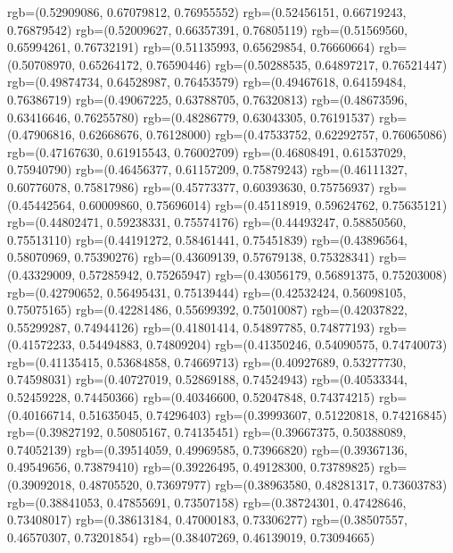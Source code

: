 {{        rgb=(0.52909086, 0.67079812, 0.76955552)
        rgb=(0.52456151, 0.66719243, 0.76879542)
        rgb=(0.52009627, 0.66357391, 0.76805119)
        rgb=(0.51569560, 0.65994261, 0.76732191)
        rgb=(0.51135993, 0.65629854, 0.76660664)
        rgb=(0.50708970, 0.65264172, 0.76590446)
        rgb=(0.50288535, 0.64897217, 0.76521447)
        rgb=(0.49874734, 0.64528987, 0.76453579)
        rgb=(0.49467618, 0.64159484, 0.76386719)
        rgb=(0.49067225, 0.63788705, 0.76320813)
        rgb=(0.48673596, 0.63416646, 0.76255780)
        rgb=(0.48286779, 0.63043305, 0.76191537)
        rgb=(0.47906816, 0.62668676, 0.76128000)
        rgb=(0.47533752, 0.62292757, 0.76065086)
        rgb=(0.47167630, 0.61915543, 0.76002709)
        rgb=(0.46808491, 0.61537029, 0.75940790)
        rgb=(0.46456377, 0.61157209, 0.75879243)
        rgb=(0.46111327, 0.60776078, 0.75817986)
        rgb=(0.45773377, 0.60393630, 0.75756937)
        rgb=(0.45442564, 0.60009860, 0.75696014)
        rgb=(0.45118919, 0.59624762, 0.75635121)
        rgb=(0.44802471, 0.59238331, 0.75574176)
        rgb=(0.44493247, 0.58850560, 0.75513110)
        rgb=(0.44191272, 0.58461441, 0.75451839)
        rgb=(0.43896564, 0.58070969, 0.75390276)
        rgb=(0.43609139, 0.57679138, 0.75328341)
        rgb=(0.43329009, 0.57285942, 0.75265947)
        rgb=(0.43056179, 0.56891375, 0.75203008)
        rgb=(0.42790652, 0.56495431, 0.75139444)
        rgb=(0.42532424, 0.56098105, 0.75075165)
        rgb=(0.42281486, 0.55699392, 0.75010087)
        rgb=(0.42037822, 0.55299287, 0.74944126)
        rgb=(0.41801414, 0.54897785, 0.74877193)
        rgb=(0.41572233, 0.54494883, 0.74809204)
        rgb=(0.41350246, 0.54090575, 0.74740073)
        rgb=(0.41135415, 0.53684858, 0.74669713)
        rgb=(0.40927689, 0.53277730, 0.74598031)
        rgb=(0.40727019, 0.52869188, 0.74524943)
        rgb=(0.40533344, 0.52459228, 0.74450366)
        rgb=(0.40346600, 0.52047848, 0.74374215)
        rgb=(0.40166714, 0.51635045, 0.74296403)
        rgb=(0.39993607, 0.51220818, 0.74216845)
        rgb=(0.39827192, 0.50805167, 0.74135451)
        rgb=(0.39667375, 0.50388089, 0.74052139)
        rgb=(0.39514059, 0.49969585, 0.73966820)
        rgb=(0.39367136, 0.49549656, 0.73879410)
        rgb=(0.39226495, 0.49128300, 0.73789825)
        rgb=(0.39092018, 0.48705520, 0.73697977)
        rgb=(0.38963580, 0.48281317, 0.73603783)
        rgb=(0.38841053, 0.47855691, 0.73507158)
        rgb=(0.38724301, 0.47428646, 0.73408017)
        rgb=(0.38613184, 0.47000183, 0.73306277)
        rgb=(0.38507557, 0.46570307, 0.73201854)
        rgb=(0.38407269, 0.46139019, 0.73094665)
}}
